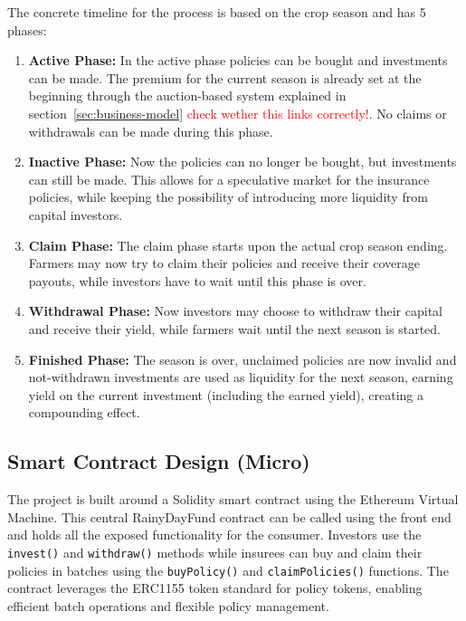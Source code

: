 \documentclass[11pt,a4paper]{article}
\begin{document}
    The concrete timeline for the process is based on the crop season and has 5 phases:
    \begin{enumerate}
        \item \textbf{Active Phase:} In the active phase policies can be bought and investments can be made.
        The premium for the current season is already set at the beginning through the auction-based system explained in section~\ref{sec:business-model} \textcolor{red}{check wether this links correctly!}.
        No claims or withdrawals can be made during this phase.
        \item \textbf{Inactive Phase:} Now the policies can no longer be bought, but investments can still be made.
        This allows for a speculative market for the insurance policies, while keeping the possibility of introducing more liquidity from capital investors.
        \item \textbf{Claim Phase:} The claim phase starts upon the actual crop season ending.
        Farmers may now try to claim their policies and receive their coverage payouts, while investors have to wait until this phase is over.
        \item \textbf{Withdrawal Phase:} Now investors may choose to withdraw their capital and receive their yield, while farmers wait until the next season is started.
        \item \textbf{Finished Phase:} The season is over, unclaimed policies are now invalid and not-withdrawn investments are used as liquidity for the next season, earning yield on the current investment (including the earned yield), creating a compounding effect.
    \end{enumerate}

    \subsection{Smart Contract Design (Micro)}\label{subsec:smart-contract-design}
    The project is built around a Solidity smart contract using the Ethereum Virtual Machine.
    This central RainyDayFund contract can be called using the front end and holds all the exposed functionality for the consumer.
    Investors use the \texttt{invest()} and \texttt{withdraw()} methods while insurees can buy and claim their policies in batches using the \texttt{buyPolicy()} and \texttt{claimPolicies()} functions.
    The contract leverages the ERC1155 token standard for policy tokens, enabling efficient batch operations and flexible policy management.
\end{document}
